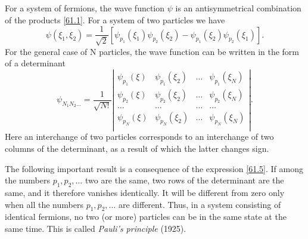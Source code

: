 For a system of fermions, the wave function $\psi$ is an antisymmetrical combination of the products \eqref{61.1}. For a system of two particles we have
\begin{equation}\label{61.4}
\psi(\xi_1,\xi_2)=\frac{1}{\sqrt{2}}\left[\psi_{p_1}(\xi_1)\psi_{p_2}(\xi_2)-\psi_{p_1}(\xi_2)\psi_{p_2}(\xi_1) \right].
\end{equation}
For the general case of N particles, the wave function can be written in the form of a determinant
\begin{equation}\label{61.5}
\psi_{N_1N_2\dots}=\frac{1}{\sqrt{N!}}\left|\begin{array}{cccc}
\psi_{p_1}(\xi)&\psi_{p_1}(\xi_2)&\dots&\psi_{p_1}(\xi_N)\\
\psi_{p_2}(\xi)&\psi_{p_2}(\xi_2)&\dots&\psi_{p_2}(\xi_N)\\
\dots&\dots&\dots&\dots\\
\psi_{p_N}(\xi)&\psi_{p_N}(\xi_2)&\dots&\psi_{p_N}(\xi_N)\\
\end{array}   \right|.
\end{equation}
Here an interchange of two particles corresponds to an interchange of two columns of the determinant, as a result of which the latter changes sign.

The following important result is a consequence of the expression \eqref{61.5}. If among the numbers $ p_1, p_2, \dots $ two are the same, two rows of the determinant are the same, and it therefore vanishes identically. It will be different from zero only when all the numbers $ p_1, p_2, \dots $ are different. Thus, in a system consisting of identical fermions, no two (or more) particles can be in the same state at the same time. This is called \textit{Pauli’s principle} (1925).
